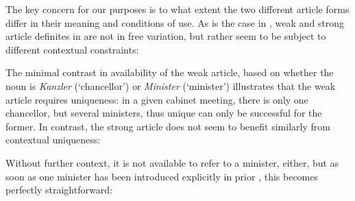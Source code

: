 \documentclass[output=paper
,modfonts
,nonflat]{langscibook}
\begin{document}
The key concern for our purposes is to what extent the two different
article forms differ in their meaning and conditions of use. As is the
case in  , weak and strong article definites in
 are not in free variation, but rather seem to be subject to
different contextual constraints:

\begin{exe}
\ex {}
\label{ex:schwarz:5}

\end{exe}

The minimal contrast in availability of the weak article, based on
whether the noun is \textit{Kanzler} (`chancellor') or
\textit{Minister} (`minister') illustrates that the weak article
requires uniqueness: in a given cabinet meeting, there is only one
chancellor, but several ministers, thus unique  can only be
successful for the former. In contrast, the strong article does not
seem to benefit similarly from contextual uniqueness:

\begin{exe}
\ex\label{ex:schwarz:6} 
\end{exe}

Without further context, it is not available to refer to a minister,
either, but as soon as one minister has been introduced explicitly in
prior , this becomes perfectly straightforward: \newpage 


\begin{exe}
\ex {}\label{ex:schwarz:7}
\begin{xlist}
\label{ex:schwarz:7b}
\end{xlist}
\end{exe}
\end{document}
